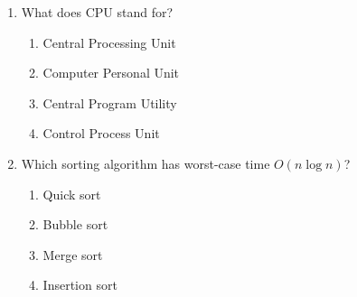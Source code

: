 \documentclass[11pt,a4paper]{article}
\begin{document}
\begin{enumerate}[label=\textbf{Q\arabic*.},leftmargin=*,itemsep=12pt,parsep=0pt,topsep=0pt,%
                  start=9]
\item What does CPU stand for?
  \begin{enumerate}[label=\textbf{\Alph*.},leftmargin=2.4em,itemsep=4pt,parsep=0pt,topsep=5pt]
  \item Central Processing Unit
  \item Computer Personal Unit
  \item Central Program Utility
  \item Control Process Unit
  \end{enumerate}

\item Which sorting algorithm has worst-case time $O(n \log n)$?
  \begin{enumerate}[label=\textbf{\Alph*.},leftmargin=2.4em,itemsep=4pt,parsep=0pt,topsep=5pt]
  \item Quick sort
  \item Bubble sort
  \item Merge sort
  \item Insertion sort
  \end{enumerate}

\end{enumerate}
\end{document}
